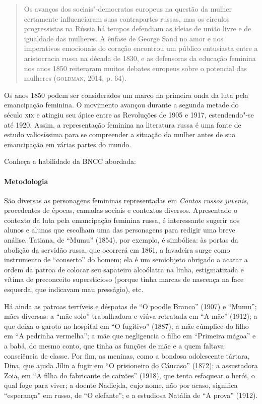 \documentclass[11pt]{extarticle}
\begin{document}
\begin{quote}
Os avanços dos sociais"-democratas europeus na questão da mulher
certamente influenciaram suas contrapartes russas, mas os círculos
progressistas na Rússia há tempos defendiam as ideias de união livre e
de igualdade das mulheres. A ênfase de George Sand no amor e nos
imperativos emocionais do coração encontrou um público entusiasta entre
a aristocracia russa na década de 1830, e as defensoras da educação
feminina nos anos 1850 reiteraram muitos debates europeus sobre o
potencial das mulheres (\textsc{goldman}, 2014, p. 64).
\end{quote}

Os anos 1850 podem ser considerados um marco na primeira onda da luta
pela emancipação feminina. O movimento avançou durante a segunda metade
do século \textsc{xix} e atingiu seu ápice entre as Revoluções de 1905 e 1917,
estendendo"-se até 1920. Assim, a representação feminina na literatura
russa é uma fonte de estudo valiosíssima para se compreender a situação
da mulher antes de sua emancipação em várias partes do mundo.


Conheça a habilidade da BNCC abordada:

\paragraph{Metodologia}
São diversas as personagens femininas representadas em \emph{Contos
russos juvenis}, procedentes de épocas, camadas sociais e contextos
diversos. Apresentado o contexto da luta pela emancipação feminina
russa, é interessante sugerir aos alunos e alunas que escolham uma das
personagens para redigir uma breve análise. Tatiana, de ``Mumu'' (1854),
por exemplo, é simbólica: às portas da abolição da servidão russa, que
ocorrerá em 1861, a lavadeira surge como instrumento de ``conserto'' do
homem; ela é um semiobjeto obrigado a acatar a ordem da patroa de
colocar seu sapateiro alcoólatra na linha, estigmatizada e vítima de
preconceito supersticioso (porque tinha marcas de nascença na face
esquerda, que indicavam mau presságio), etc. 


Há ainda as patroas
terríveis e déspotas de ``O poodle Branco'' (1907) e ``Mumu''; mães
diversas: a ``mãe solo'' trabalhadora e viúva retratada em ``A mãe''
(1912); a que deixa o garoto no hospital em ``O fugitivo'' (1887); a mãe
cúmplice do filho em ``A pedrinha vermelha''; a mãe que negligencia o
filho em ``Primeira mágoa'' e a babá, do mesmo conto, que tinha
as funções de mãe e a quem faltava consciência de classe. Por fim, as
meninas, como a bondosa adolescente tártara, Dina, que ajuda Jílin a
fugir em ``O prisioneiro do Cáucaso'' (1872); a assustadora Zoia,
em ``A filha do fabricante de caixões'' (1918), que tenta
esfaquear o herói, o qual foge para viver; a doente Nadiejda, cujo nome,
não por acaso, significa ``esperança'' em russo, de ``O
elefante''; e a estudiosa Natália de ``A prova'' (1912).
\end{document}

